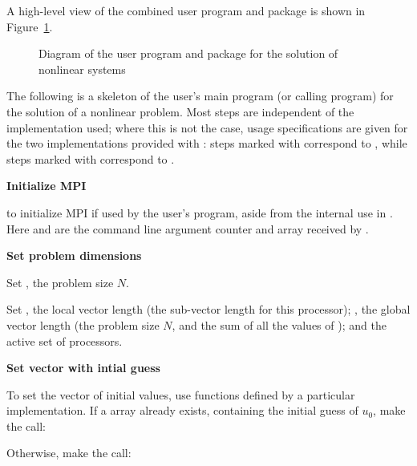 A high-level view of the combined user program and {\kinsol} package is
shown in Figure~\ref{f:sim_overview}.
\begin{figure}
\centerline{}
\caption {Diagram of the user program and 
  {\kinsol} package for the solution of nonlinear systems}\label{f:sim_overview}
\end{figure}
The following is a skeleton of the user's main program (or calling
program) for the solution of a nonlinear problem. 
Most steps are independent of the {\nvector} implementation used; 
where this is not the case, usage specifications are given for the two implementations 
provided with {\kinsol}: steps marked with {\p} correspond to 
{\nvecp}, while steps marked with {\s} correspond to {\nvecs}.
%
\begin{Steps}
  
\item 
  {\bf Initialize MPI}

  {\p}  to initialize MPI if used by
  the user's program, aside from the internal use in {\nvecp}.  
  Here  and  are the command line argument 
  counter and array received by .
  
\item
  {\bf Set problem dimensions}

  {\s} Set , the problem size $N$.

  {\p} Set , the local vector length (the sub-vector
  length for this processor); , the global vector length (the
  problem size $N$, and the sum of all the values of );
  and the active set of processors.
  
\item
  {\bf Set vector with intial guess}
 
  To set the vector  of initial values, use functions defined by a
  particular {\nvector} implementation.  If a  array  
  already exists, containing the initial guess of $u_0$, make the call:

  {\s} 

  {\p} 

  Otherwise, make the call:

  {\s} 

  {\p} 


\end{Steps}
